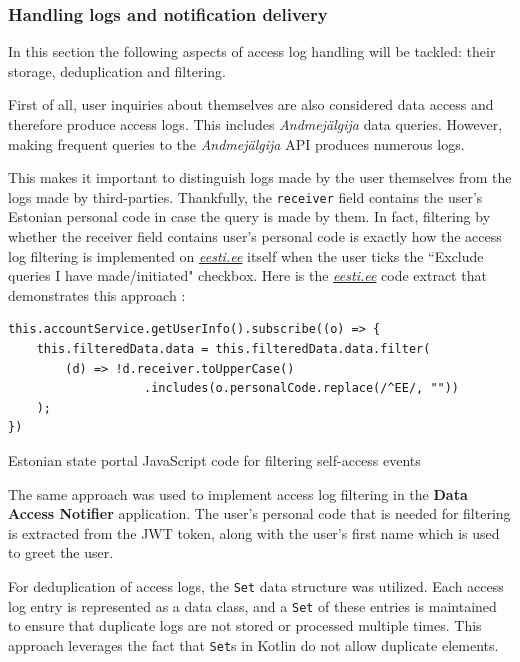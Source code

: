 \subsubsection{Handling logs and notification delivery}
\label{log-handling}
In this section the following aspects of access log handling will be tackled: their storage, deduplication and filtering.

First of all, user inquiries about themselves are also considered data access and therefore produce access logs. This includes \textit{Andmejälgija} data queries. However, making frequent queries to the \textit{Andmejälgija} API produces numerous logs. 

This makes it important to distinguish logs made by the user themselves from the logs made by third-parties. Thankfully, the \texttt{receiver} field contains the user's Estonian personal code in case the query is made by them. In fact, filtering by whether the receiver field contains user's personal code is exactly how the access log filtering is implemented on \textit{\href{https://www.eesti.ee}{eesti.ee}} itself when the user ticks the ``Exclude queries I have made/initiated" checkbox. Here is the \textit{\href{https://www.eesti.ee}{eesti.ee}} code extract that demonstrates this approach \cite{eesti-ee-portal}:

\begin{listing}[H]
\begin{verbatim}
this.accountService.getUserInfo().subscribe((o) => {
    this.filteredData.data = this.filteredData.data.filter(
        (d) => !d.receiver.toUpperCase()
                   .includes(o.personalCode.replace(/^EE/, ""))
    );
})
\end{verbatim}
\caption{Estonian state portal JavaScript code for filtering self-access events}
\label{lst:eesti-ee-filtering}
\end{listing}

The same approach was used to implement access log filtering in the \textbf{Data Access Notifier} application. The user's personal code that is needed for filtering is extracted from the JWT token, along with the user's first name which is used to greet the user.

For deduplication of access logs, the \texttt{Set} data structure was utilized. Each access log entry is represented as a data class, and a \texttt{Set} of these entries is maintained to ensure that duplicate logs are not stored or processed multiple times. This approach leverages the fact that \texttt{Set}s in Kotlin do not allow duplicate elements.

